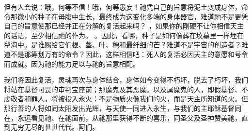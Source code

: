 但有人会说：哦，何等不信！哦，何等愚妄！祂凭自己的旨意将泥土变成身体，命令那微小的种子在母腹中生长，最终成为这变化多端的身体器官，难道祂不是更凭自己的旨意使那已经并正在分解的复活起来吗？ ，如果你的刚硬不让你相信天主的话语，至少相信祂的作为。 。因此，看哪，种子是如何像葬在坟墓里一样埋在犁沟中。是谁赐给它们根、茎、叶、穗和最纤细的芒？难道不是宇宙的创造者？难道不是那筹划万有的命令？因此，这样相信吧：死人的复活必因天主的意愿和号令而成就。因为祂的能力足以与祂的旨意相配。\par

我们将因此复活，灵魂再次与身体结合，身体如今变得不朽坏，脱去了朽坏，我们将站在基督可畏的审判宝座前；那魔鬼及其恶魔，以及属魔鬼的人，即假基督、不虔敬者和罪人，将被投入永火：不是物质火像我们的火，而是天主所知道的火。但那行善的人将如同太阳发出光辉，与天使一同进入永生，与我们的主耶稣基督同在，永远看见祂、在祂面前，从祂那里获得不断的喜乐，同圣父及圣神赞美祂，直到无穷无尽的世世代代。阿们。\par

